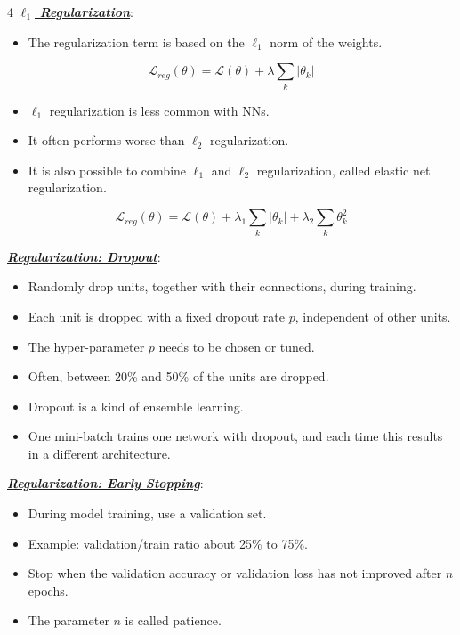 \documentclass[12pt]{article}
\newcommand{\bulletPoint}[1]{\ul{\textit{\textbf{#1}}}}
\begin{document}
\begin{multicols*}{4}
\bulletPoint{$\ell_1$ Regularization}:
\begin{itemize}
\item The regularization term is based on the $\ell_1$ norm of the weights.
\end{itemize}
\useshortskip
\begin{equation*}
    \mathcal{L}_{reg}(\theta)=\mathcal{L}(\theta)+\lambda\sum_k |\theta_k|
\end{equation*}
\begin{itemize}
\item $\ell_1$ regularization is less common with NNs.
\item It often performs worse than $\ell_2$ regularization.
\item It is also possible to combine $\ell_1$ and $\ell_2$ regularization, called elastic net regularization.
\end{itemize}
\useshortskip
\begin{equation*}
    \mathcal{L}_{reg}(\theta)=\mathcal{L}(\theta)+\lambda_1\sum_k |\theta_k|+\lambda_2\sum_k \theta_k^2
\end{equation*}

\bulletPoint{Regularization: Dropout}:
\begin{itemize}
\item Randomly drop units, together with their connections, during training.
\item Each unit is dropped with a fixed dropout rate $p$, independent of other units.
\item The hyper-parameter $p$ needs to be chosen or tuned.
\item Often, between 20\% and 50\% of the units are dropped.
\item Dropout is a kind of ensemble learning.
\item One mini-batch trains one network with dropout, and each time this results in a different architecture.
\end{itemize}

\bulletPoint{Regularization: Early Stopping}:
\begin{itemize}
\item During model training, use a validation set.
\item Example: validation/train ratio about 25\% to 75\%.
\item Stop when the validation accuracy or validation loss has not improved after $n$ epochs.
\item The parameter $n$ is called patience.
\end{itemize}


\end{multicols*}
\end{document}
